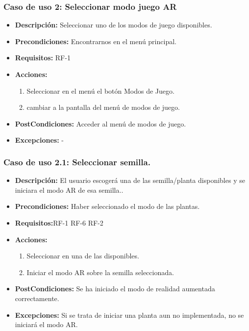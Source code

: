 \subsubsection{Caso de uso 2:  Seleccionar modo juego AR}
 \begin{itemize}
 	\item \textbf{Descripción:} Seleccionar uno de los modos de juego disponibles.
 	\item \textbf{Precondiciones:} Encontrarnos en el menú principal.
 	\item \textbf{Requisitos:} RF-1
 	\item \textbf{Acciones:}
 	\begin{enumerate}
 		\item Seleccionar en el menú el botón Modos de Juego.
 		\item cambiar a la pantalla del menú de modos de juego.
 	\end{enumerate}
 	\item \textbf{PostCondiciones:} Acceder al menú de modos de juego.
 	\item \textbf{Excepciones:}	-
 \end{itemize}
\subsubsection{Caso de uso 2.1: Seleccionar semilla.}
\begin{itemize}
	\item \textbf{Descripción:} El usuario escogerá una de las semilla/planta disponibles y se iniciara el modo AR de esa semilla..
	\item \textbf{Precondiciones:} Haber seleccionado el modo de las plantas.
	\item \textbf{Requisitos:}RF-1 RF-6 RF-2
	\item \textbf{Acciones:}
	\begin{enumerate}
		\item Seleccionar en una de las disponibles.
		\item Iniciar el modo AR sobre la semilla seleccionada.
	\end{enumerate}
	\item \textbf{PostCondiciones:} Se ha iniciado el modo de realidad aumentada correctamente.
	\item \textbf{Excepciones:} Si se trata de iniciar una planta aun no implementada, no se iniciará el modo AR.
\end{itemize}
